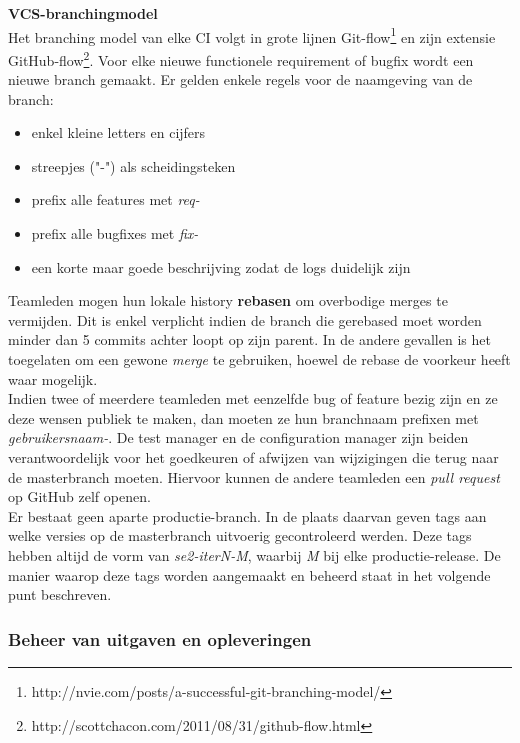 \textbf{VCS-branchingmodel} \\

Het branching model van elke CI volgt in grote lijnen Git-flow\footnote{http://nvie.com/posts/a-successful-git-branching-model/} en zijn extensie GitHub-flow\footnote{http://scottchacon.com/2011/08/31/github-flow.html}. Voor elke nieuwe functionele requirement of bugfix wordt een nieuwe branch gemaakt. Er gelden enkele regels voor de naamgeving van de branch:

\begin{itemize}
\item enkel kleine letters en cijfers
\item streepjes ("-") als scheidingsteken
\item prefix alle features met \textit{req-}
\item prefix alle bugfixes met \textit{fix-}
\item een korte maar goede beschrijving zodat de logs duidelijk zijn
\end{itemize}

Teamleden mogen hun lokale history \textbf{rebasen} om overbodige merges te vermijden. Dit is enkel verplicht indien de branch die gerebased moet worden minder dan 5 commits achter loopt op zijn parent. In de andere gevallen is het toegelaten om een gewone \textit{merge} te gebruiken, hoewel de rebase de voorkeur heeft waar mogelijk.\\

Indien twee of meerdere teamleden met eenzelfde bug of feature bezig zijn en ze deze wensen publiek te maken, dan moeten ze hun branchnaam prefixen met \textit{gebruikersnaam-}. De test manager en de configuration manager zijn beiden verantwoordelijk voor het goedkeuren of afwijzen van wijzigingen die terug naar de masterbranch moeten. Hiervoor kunnen de andere teamleden een \textit{pull request} op GitHub zelf openen. \\

Er bestaat geen aparte productie-branch. In de plaats daarvan geven tags aan welke versies op de masterbranch uitvoerig gecontroleerd werden. Deze tags hebben altijd de vorm van \textit{se2-iterN-M}, waarbij \textit{M} bij elke productie-release. De manier waarop deze tags worden aangemaakt en beheerd staat in het volgende punt beschreven.

\subsubsection{Beheer van uitgaven en opleveringen}

